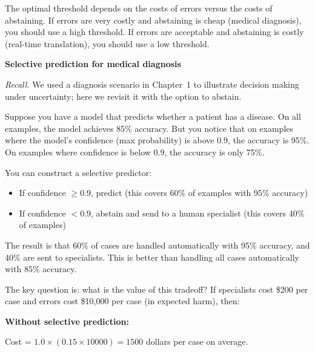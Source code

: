 The optimal threshold depends on the costs of errors versus the costs of abstaining. If errors are very costly and abstaining is cheap (medical diagnosis), you should use a high threshold. If errors are acceptable and abstaining is costly (real-time translation), you should use a low threshold.

\vspace{1.5em}

\begin{examplebox}
\textbf{Selective prediction for medical diagnosis}


\emph{Recall.} We used a diagnosis scenario in Chapter~1 to illustrate decision making under uncertainty; here we revisit it with the option to abstain.
\vspace{0.5em}

Suppose you have a model that predicts whether a patient has a disease. On all examples, the model achieves 85\% accuracy. But you notice that on examples where the model's confidence (max probability) is above 0.9, the accuracy is 95\%. On examples where confidence is below 0.9, the accuracy is only 75\%.

\vspace{0.5em}

You can construct a selective predictor:

\begin{itemize}
\item If confidence $\geq 0.9$, predict (this covers 60\% of examples with 95\% accuracy)
\item If confidence $< 0.9$, abstain and send to a human specialist (this covers 40\% of examples)
\end{itemize}

\vspace{0.5em}

The result is that 60\% of cases are handled automatically with 95\% accuracy, and 40\% are sent to specialists. This is better than handling all cases automatically with 85\% accuracy.

\vspace{0.5em}

The key question is: what is the value of this tradeoff? If specialists cost \$200 per case and errors cost \$10,000 per case (in expected harm), then:

\vspace{0.5em}

\textbf{Without selective prediction:}

Cost = $1.0 \times (0.15 \times 10000) = 1500$ dollars per case on average.


\end{examplebox}
